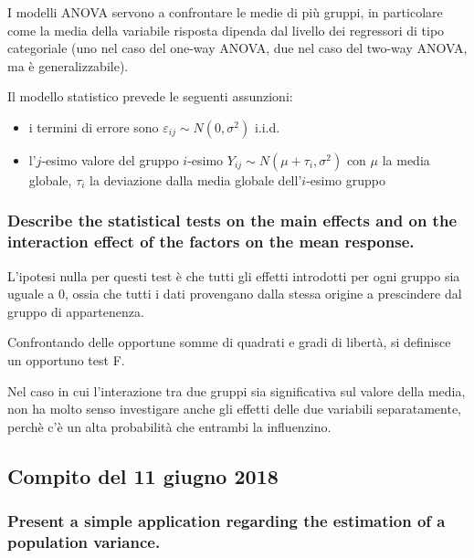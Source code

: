 \documentclass[
]{article}
\begin{document}
I modelli ANOVA servono a confrontare le medie di più gruppi, in
particolare come la media della variabile risposta dipenda dal livello
dei regressori di tipo categoriale (uno nel caso del one-way ANOVA, due
nel caso del two-way ANOVA, ma è generalizzabile).

Il modello statistico prevede le seguenti assunzioni:

\begin{itemize}
\item
  i termini di errore sono \(\varepsilon_{ij} \sim N(0, \sigma^2)\)
  i.i.d.
\item
  l'\(j\)-esimo valore del gruppo \(i\)-esimo
  \(Y_{ij} \sim N(\mu+\tau_i, \sigma^2)\) con \(\mu\) la media globale,
  \(\tau_i\) la deviazione dalla media globale dell'\(i\)-esimo gruppo
\end{itemize}

\hypertarget{describe-the-statistical-tests-on-the-main-effects-and-on-the-interaction-effect-of-the-factors-on-the-mean-response.}{%
\subsubsection{Describe the statistical tests on the main effects and on
the interaction effect of the factors on the mean
response.}\label{describe-the-statistical-tests-on-the-main-effects-and-on-the-interaction-effect-of-the-factors-on-the-mean-response.}}

L'ipotesi nulla per questi test è che tutti gli effetti introdotti per
ogni gruppo sia uguale a 0, ossia che tutti i dati provengano dalla
stessa origine a prescindere dal gruppo di appartenenza.

Confrontando delle opportune somme di quadrati e gradi di libertà, si
definisce un opportuno test F.

Nel caso in cui l'interazione tra due gruppi sia significativa sul
valore della media, non ha molto senso investigare anche gli effetti
delle due variabili separatamente, perchè c'è un alta probabilità che
entrambi la influenzino.

\hypertarget{compito-del-11-giugno-2018}{%
\subsection{Compito del 11 giugno
2018}\label{compito-del-11-giugno-2018}}

\hypertarget{present-a-simple-application-regarding-the-estimation-of-a-population-variance.}{%
\subsubsection{Present a simple application regarding the estimation of
a population
variance.}\label{present-a-simple-application-regarding-the-estimation-of-a-population-variance.}}
\end{document}
